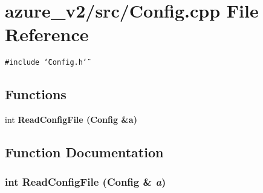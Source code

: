 \section{azure\_\-v2/src/Config.cpp File Reference}
\label{Config_8cpp}
{\tt \#include \char`\"{}Config.h\char`\"{}}\par
\subsection*{Functions}
\begin{CompactItemize}
\item 
int \bf{Read\-Config\-File} (\bf{Config} \&a)
\end{CompactItemize}


\subsection{Function Documentation}
\subsubsection{\setlength{\rightskip}{0pt plus 5cm}int Read\-Config\-File (\bf{Config} \& {\em a})}\label{Config_8cpp_86ba425cfbf321ff0c9ba96e937201d3}


